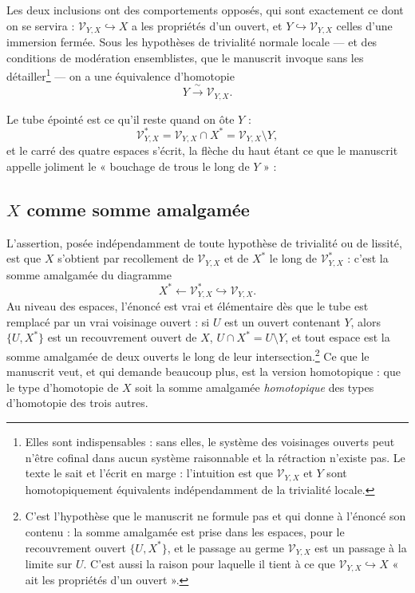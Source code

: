 \documentclass[11pt,a4paper]{article}
\begin{document}
Les deux inclusions ont des comportements opposés, qui sont exactement ce dont
on se servira : $\mathcal{V}_{Y,X} \hookrightarrow X$ a les propriétés d'un
ouvert, et $Y \hookrightarrow \mathcal{V}_{Y,X}$ celles d'une immersion fermée.
Sous les hypothèses de trivialité normale locale — et des conditions de
modération ensemblistes, que le manuscrit invoque sans les
détailler\footnote{Elles sont indispensables : sans elles, le système des
voisinages ouverts peut n'être cofinal dans aucun système raisonnable et la
rétraction n'existe pas. Le texte le sait et l'écrit en marge : l'intuition est
que $\mathcal{V}_{Y,X}$ et $Y$ sont homotopiquement équivalents indépendamment de
la trivialité locale.} — on a une équivalence d'homotopie
\[
  Y \xrightarrow{\ \sim\ } \mathcal{V}_{Y,X}.
\]

Le tube épointé est ce qu'il reste quand on ôte $Y$ :
\[
  \mathcal{V}^{*}_{Y,X} = \mathcal{V}_{Y,X} \cap X^{*}
  = \mathcal{V}_{Y,X} \setminus Y,
\]
et le carré des quatre espaces s'écrit, la flèche du haut étant ce que le
manuscrit appelle joliment le « bouchage de trous le long de $Y$ » :


\subsection*{$X$ comme somme amalgamée}

L'assertion, posée indépendamment de toute hypothèse de trivialité ou de
lissité, est que $X$ s'obtient par recollement de $\mathcal{V}_{Y,X}$ et de
$X^{*}$ le long de $\mathcal{V}^{*}_{Y,X}$ : c'est la somme amalgamée du
diagramme
\[
  X^{*} \longleftarrow \mathcal{V}^{*}_{Y,X} \hookrightarrow \mathcal{V}_{Y,X}.
\]
Au niveau des espaces, l'énoncé est vrai et élémentaire dès que le tube est
remplacé par un vrai voisinage ouvert : si $U$ est un ouvert contenant $Y$,
alors $\{U, X^{*}\}$ est un recouvrement ouvert de $X$, $U \cap X^{*} = U
\setminus Y$, et tout espace est la somme amalgamée de deux ouverts le long de
leur intersection.\footnote{C'est l'hypothèse que le manuscrit ne formule pas et
qui donne à l'énoncé son contenu : la somme amalgamée est prise dans les
espaces, pour le recouvrement ouvert $\{U,X^{*}\}$, et le passage au germe
$\mathcal{V}_{Y,X}$ est un passage à la limite sur $U$. C'est aussi la raison
pour laquelle il tient à ce que $\mathcal{V}_{Y,X} \hookrightarrow X$ « ait les
propriétés d'un ouvert ».} Ce que le manuscrit veut, et qui demande beaucoup
plus, est la version homotopique : que le type d'homotopie de $X$ soit la somme
amalgamée \emph{homotopique} des types d'homotopie des trois autres.
\end{document}
